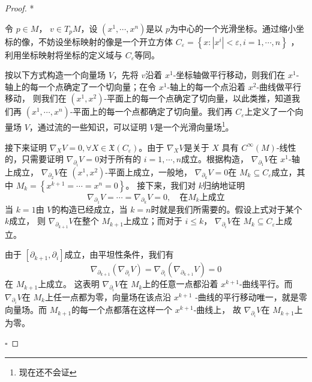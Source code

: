 \documentclass[../../几何与拓扑.tex]{subfiles}
\begin{document}
\begin{proof}*
    
    令 \(  p \in M  \)， \(  v\in T_{p}M  \)，设 \(  \left(  x^1,\cdots,x^n  \right)   \)是以 \(  p  \)为中心的一个光滑坐标。通过缩小坐标的像，不妨设坐标映射的像是一个开立方体 \(  C_{ \varepsilon }= \left\{ x: \left| x^{i} \right|<  \varepsilon ,i=  1,\cdots,n   \right\}  \)     ，利用坐标映射将坐标的定义域与 \(  C_{ \varepsilon }  \)等同。
    
    
    按以下方式构造一个向量场 \(  V  \)，先将 \(  v  \)沿着 \(  x^{1}  \)-坐标轴做平行移动，则我们在 \(  x^{1}  \)-轴上的每一个点确定了一个切向量；在令 \(  x^{1}  \)-轴上的每一个点沿着 \(  x^{2}  \)-曲线做平行移动， 则我们在 \(  \left( x^{1},x^{2} \right)   \)-平面上的每一个点确定了切向量，以此类推，知道我们再 \(  \left( x^{1},\cdots ,x^{n} \right)   \)-平面上的每一个点都确定了切向量。我们再 \(  C_{ \varepsilon }  \)上定义了一个向量场 \(  V  \)，通过流的一些知识，可以证明 \(  V  \)是一个光滑向量场\footnote{现在还不会证}。
    
    接下来证明 \(   \nabla _{X}V= 0,\forall X \in \mathfrak{X}\left( C_{ \varepsilon } \right)   \)。由于 \(   \nabla _{X}V  \)是关于 \(  X  \) 具有 \( C^{\infty}\left( M \right)   \)-线性的，只需要证明 \(   \nabla _{\partial _{i}}  V= 0\)对于所有的 \(  i=  1,\cdots,n   \)成立。根据构造， \(   \nabla _{\partial _{1}}V  \)在 \(  x^{1}  \)-轴上成立， \(   \nabla _{\partial _{2}}  V\)在 \(  \left( x^{1},x^{2} \right)   \)-平面上成立，一般地， \(   \nabla _{\partial _{k}}V= 0  \)在 \(  M_{k}\subseteq C_{ \varepsilon }  \)成立，其中 \(  M_{k}= \left\{ x^{k+ 1} = \cdots = x^{n}= 0\right\}  \)。  接下来，我们对 \(  k  \)归纳地证明 \[
     \nabla _{\partial _{1}}V= \cdots =  \nabla _{\partial _{k}}V= 0,\quad \text{在}M_{k}\text{上成立}
    \]       当 \(  k= 1  \)由 \(  V  \)的构造已经成立，当 \(  k= n  \)时就是我们所需要的。假设上式对于某个 \(  k  \)成立， 则 \(   \nabla _{\partial _{k+ 1}}V  \)在整个 \(  M_{k+ 1}  \)上成立；而对于 \(  i\le k  \)， \(   \nabla _{\partial _{i}}V  \)在 \(  M_{k}\subseteq C_{ \varepsilon }  \)上成立。
    
    由于 \(  \left[ \partial _{k+ 1},\partial _{i} \right]   \)成立，由平坦性条件，我们有 \[
     \nabla _{\partial _{k+ 1}}\left(  \nabla _{\partial _{i}}V \right)=   \nabla _{\partial _{i}}\left(  \nabla _{\partial _{k+ 1}}V \right)=  0
    \]在 \(  M_{k+ 1}  \)上成立。  这表明 \(   \nabla _{\partial _{i}}V  \)在 \(  M_{k}  \)上的任意一点都沿着 \(  x^{k+ 1}  \)-曲线平行。而 \(   \nabla _{\partial _{i}}V  \)在 \(  M_{k}  \)上任一点都为零，向量场在该点沿 \(  x^{k+ 1}  \)     -曲线的平行移动唯一，就是零向量场。而 \(  M_{k+ 1}  \)的每一个点都落在这样一个 \(  x^{k+ 1}  \)-曲线上，   故 \(   \nabla _{\partial _{i}}  V\)在 \(  M_{k+ 1}  \)上为零。  

    \hfill $\square$
\end{proof}
\end{document}
